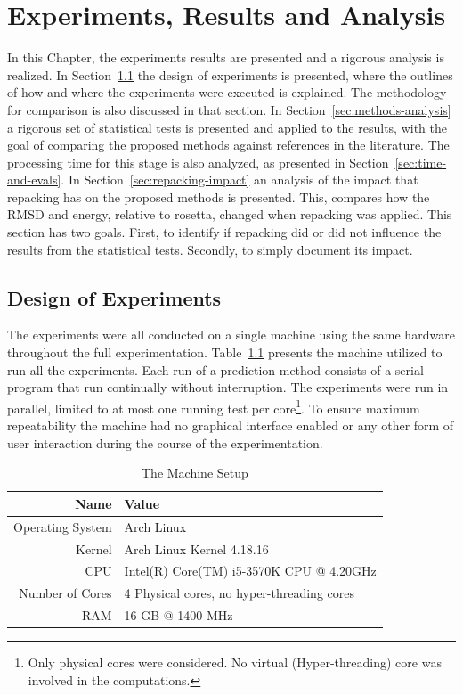 \chapter{Experiments, Results and Analysis}\label{chap:experiments_and_results}

In this Chapter, the experiments results are presented and a rigorous
analysis is realized. In Section~\ref{sec:design_of_experiments}
the design of experiments is presented, where the outlines of how
and where the experiments were executed is explained. The methodology
for comparison is also discussed in that section. In
Section~\ref{sec:methods-analysis} a rigorous set of statistical
tests is presented and applied to the results, with the goal of
comparing the proposed methods against references in the literature.
The processing time for this stage is also analyzed, as presented in
Section~\ref{sec:time-and-evals}.
In Section~\ref{sec:repacking-impact} an analysis of the impact that
repacking has on the proposed methods is presented. This, compares how
the RMSD and energy, relative to rosetta, changed when repacking was
applied. This section has two goals. First, to identify if repacking
did or did not influence the results from the statistical tests.
Secondly, to simply document its impact.

\section{Design of Experiments}\label{sec:design_of_experiments}

The experiments were all conducted on a single machine using the same hardware
throughout the full experimentation. Table~\ref{tab:machine-setup}
presents the machine utilized to run all the experiments. Each run of a
prediction method consists of a serial program that run continually without
interruption. The experiments were run in parallel, limited to at most one
running test per core\footnote{Only physical cores were considered. No virtual
(Hyper-threading) core was involved in the computations.}. To ensure maximum
repeatability the machine had no graphical interface enabled or any other form
of user interaction during the course of the experimentation.

\begin{table}[th]
    \centering
    \begin{tabular}{r|l} \hline \hline
        Name & Value \\ \hline \hline
        Operating System & Arch Linux \\ \hline
        Kernel &  Arch Linux Kernel 4.18.16 \\ \hline
        CPU & Intel(R) Core(TM) i5-3570K CPU @ 4.20GHz \\ \hline
        Number of Cores & 4 Physical cores, no hyper-threading cores \\ \hline
        RAM & 16 GB @ 1400 MHz \\ \hline \hline
    \end{tabular}
    \caption{The Machine Setup}
    \label{tab:machine-setup}
\end{table}

